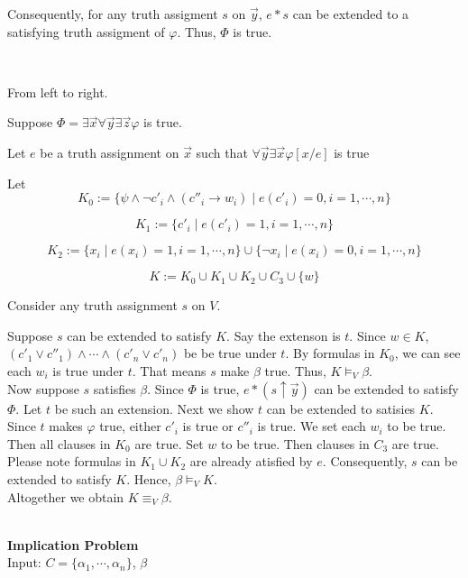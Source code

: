 \documentclass[12pt]{article}
\begin{document}
Consequently, for any truth assigment $s$ on $\vec{y}$, $e*s$ can be extended to a satisfying truth assigment of $\varphi$. Thus, $\Phi$ is true.


\ \\ 

{\color{red} From left to right.\color{black}


Suppose $\Phi=\exists\vec{x}\forall\vec{y}\exists\vec{z}\varphi$ is true. 

Let $e$ be a truth assignment on $\vec{x}$ such that $\forall\vec{y}\exists\vec{x}\varphi[x/e]$ is true


Let $$K_0:=\{\psi\wedge \neg c'_i\wedge (c''_i\rightarrow w_i)\mid e(c'_i)=0, i=1,\cdots,n\}$$

$$K_1:=\{c'_i\mid e(c'_i)=1, i=1,\cdots,n\}$$

$$K_2:=\{x_i\mid e(x_i)=1, i=1,\cdots, n\}\cup\{\neg x_i\mid e(x_i)=0, i=1,\cdots,n\}$$

$$K:=K_0\cup K_1\cup K_2\cup C_3\cup\{w\}$$


Consider any truth assignment $s$ on $V$. 

Suppose $s$ can be extended to satisfy $K$. Say the extenson is $t$. Since $w\in K$, $(c'_1\vee c''_1)\wedge\cdots\wedge(c'_n\vee c'_n)$ be be true under $t$. By formulas in $K_0$, we can see each $w_i$ is true under $t$. That means $s$ make $\beta$ true. Thus, $K\models_V\beta$. \\

Now suppose $s$ satisfies $\beta$. Since $\Phi$ is true, $e*(s\uparrow\vec{y})$ can  be extended to satisfy $\Phi$. Let $t$ be such an extension. Next we show $t$ can be extended to satisies $K$. Since $t$ makes $\varphi$ true, either $c'_i$ is true or $c''_i$ is true. We set each $w_i$ to be true. Then all clauses in $K_0$ are true. Set $w$ to be true. Then clauses in $C_3$ are true. Please note formulas in $K_1\cup K_2$ are already atisfied by $e$. Consequently, $s$ can be extended to satisfy $K$.
Hence, $\beta\models_V K$.\\

Altogether we obtain $K\equiv_V \beta$.








\ \ \\

{\bf Implication Problem}\\

Input: $C=\{\alpha_1,\cdots,\alpha_n\}$, $\beta$

}
\end{document}
